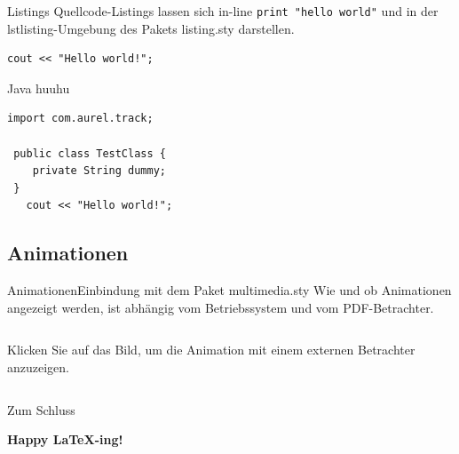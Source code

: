 \begin{frame}[fragile]{Listings}
Quellcode-Listings lassen sich in-line \lstinline|print "hello world"| und in
der lstlisting-Umgebung des Pakets listing.sty darstellen.

\begin{lstlisting}[frame=single, emph={cout}, emphstyle={\color{blue}}]
   cout << "Hello world!";
\end{lstlisting}
\end{frame}

\begin{frame}[fragile]{Java}
huuhu
\begin{lstlisting}[frame=single]
   import com.aurel.track;

 public class TestClass {
    private String dummy;
 }
   cout << "Hello world!";
\end{lstlisting}
\end{frame}

\subsection{Animationen}

\begin{frame}{Animationen}{Einbindung mit dem Paket multimedia.sty}
Wie und ob Animationen angezeigt werden, ist abhängig vom Betriebssystem und
vom PDF-Betrachter.

\begin{columns}
Klicken Sie auf das Bild, um die Animation mit einem externen Betrachter anzuzeigen.
\end{columns}
\end{frame}




\begin{frame}{Zum Schluss}
  \begin{center}
    {\Huge \textcolor{HEblue6}{\bf Happy \LaTeX{}-ing!}}
  \end{center}
\end{frame}

